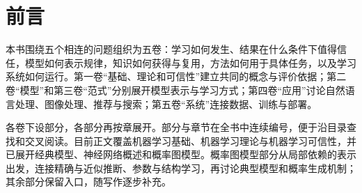\documentclass[justified,openany,nobib,nols]{tufte-book}
\title{\BookTitle}
\author{\BookAuthor}
\date{\BookEdition}
\begin{document}
\makebookcover
\frontmatter
\makebooktitle
\makebookcopyright
\tableofcontents

\chapter*{前言}

本书围绕五个相连的问题组织为五卷：学习如何发生、结果在什么条件下值得信任，模型如何表示规律，知识如何获得与复用，方法如何用于具体任务，以及学习系统如何运行。第一卷“基础、理论和可信性”建立共同的概念与评价依据；第二卷“模型”和第三卷“范式”分别展开模型表示与学习方式；第四卷“应用”讨论自然语言处理、图像处理、推荐与搜索；第五卷“系统”连接数据、训练与部署。

各卷下设部分，各部分再按章展开。部分与章节在全书中连续编号，便于沿目录查找和交叉阅读。目前正文覆盖机器学习基础、机器学习理论与机器学习可信性，并已展开经典模型、神经网络概述和概率图模型。概率图模型部分从局部依赖的表示出发，连接精确与近似推断、参数与结构学习，再讨论典型模型和概率生成机制；其余部分保留入口，随写作逐步补充。

\mainmatter






\end{document}
